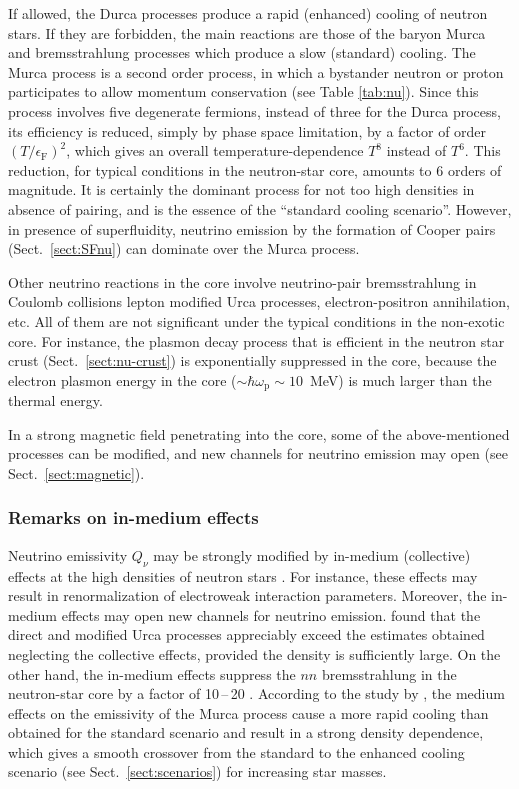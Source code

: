 \documentclass[smallextended]{svjour3}       %
\newcommand{\EF}{\epsilon_\mathrm{F}}
\newcommand{\omp}{\omega_\mathrm{p}}
\begin{document}
If allowed, the Durca processes produce a rapid (enhanced)
cooling of neutron stars. If they are forbidden, the main
reactions are those of the baryon Murca and bremsstrahlung
processes which produce a slow (standard) cooling. The Murca
process is a second order process, in which a bystander
neutron or proton participates to allow momentum
conservation (see Table \ref{tab:nu}). Since this process
involves five degenerate fermions, instead of three for the
Durca process, its efficiency is reduced, simply by phase
space limitation, by a factor of order $(T/\EF)^2$, which
gives an overall temperature-dependence $T^8$ instead of
$T^6$. This reduction, for typical conditions in the
neutron-star core, amounts to 6 orders of magnitude. It is
certainly the dominant process for not too high densities in
absence of pairing, and is the essence of the ``standard
cooling scenario''. However, in presence of superfluidity, 
neutrino emission by the formation of Cooper pairs
(Sect.~\ref{sect:SFnu}) can dominate over the Murca process.

Other neutrino reactions in the core involve neutrino-pair
bremsstrahlung in Coulomb collisions lepton modified Urca
processes, electron-positron annihilation, etc. All of them
are not significant under the typical conditions in the
non-exotic core. For instance, the plasmon decay process
that is efficient in the neutron star crust
(Sect.~\ref{sect:nu-crust}) is exponentially suppressed in
the core, because the electron plasmon energy in the core
($\sim\hbar\omp\sim10$~MeV) is much larger than the thermal
energy.

In a strong magnetic field penetrating into the core, some
of the above-mentioned processes can be modified, and new
channels for neutrino emission may open (see
Sect.~\ref{sect:magnetic}).

\subsubsection{Remarks on in-medium effects}
\label{sect:medium}

Neutrino emissivity $Q_\nu$ may be strongly modified by
in-medium (collective) effects at the high densities of
neutron stars \citep[see][for a review]{Voskresensky01}. For
instance, these effects may result in renormalization of
electroweak interaction parameters.  Moreover, the in-medium
effects may open new channels for neutrino emission.
\citet{VoskresenskySenatorov86} found that the direct and
modified Urca processes appreciably exceed the estimates
obtained neglecting the collective effects, provided the
density is sufficiently large. On the other hand, the
in-medium effects suppress the $nn$ bremsstrahlung in the
neutron-star core by a factor of 10\,--\,20
\citep{Blaschke-ea95}. According to the study by 
\citet{Schaab-ea97}, the medium effects on the emissivity of
the Murca process cause a more rapid cooling than obtained
for the standard scenario and result in a strong density
dependence, which gives a smooth crossover from the standard
to the enhanced cooling scenario (see
Sect.~\ref{sect:scenarios}) for increasing star masses.
\end{document}
